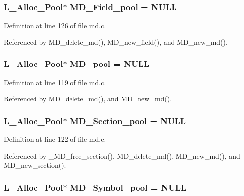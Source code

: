 \subsubsection{\setlength{\rightskip}{0pt plus 5cm}\bf{L\_\-Alloc\_\-Pool}$\ast$ \bf{MD\_\-Field\_\-pool} = NULL\hspace{0.3cm}{\tt  [static]}}\label{md_8c_90e0db930cda9bd4248c5cda8ed2bed2}




Definition at line 126 of file md.c.

Referenced by MD\_\-delete\_\-md(), MD\_\-new\_\-field(), and MD\_\-new\_\-md().
\subsubsection{\setlength{\rightskip}{0pt plus 5cm}\bf{L\_\-Alloc\_\-Pool}$\ast$ \bf{MD\_\-pool} = NULL\hspace{0.3cm}{\tt  [static]}}\label{md_8c_51ce1e81eb61c06de66940fe6047d6c8}




Definition at line 119 of file md.c.

Referenced by MD\_\-delete\_\-md(), and MD\_\-new\_\-md().
\subsubsection{\setlength{\rightskip}{0pt plus 5cm}\bf{L\_\-Alloc\_\-Pool}$\ast$ \bf{MD\_\-Section\_\-pool} = NULL\hspace{0.3cm}{\tt  [static]}}\label{md_8c_e323a57bec5325b192a51f41abc56333}




Definition at line 122 of file md.c.

Referenced by \_\-MD\_\-free\_\-section(), MD\_\-delete\_\-md(), MD\_\-new\_\-md(), and MD\_\-new\_\-section().
\subsubsection{\setlength{\rightskip}{0pt plus 5cm}\bf{L\_\-Alloc\_\-Pool}$\ast$ \bf{MD\_\-Symbol\_\-pool} = NULL\hspace{0.3cm}{\tt  [static]}}\label{md_8c_237b480ca8c78f85ecbefa3705027d72}




